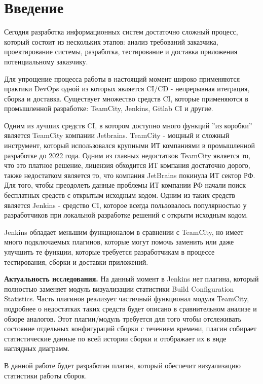 \chapter*{Введение} %

Сегодня разработка информационных систем достаточно сложный процесс, который состоит из нескольких этапов: анализ требований заказчика, проектирование системы, разработка, тестирование и доставка приложения потенциальному заказчику. 

Для упрощение процесса работы в настоящий момент широко применяются практики DevOps одной из которых является CI/CD - непрерывная итеграция, сборка и доставка. Существует множество средств CI, которые применяются в промышленной разработке: TeamCity, Jenkins, Gitlab CI и другие.

Одним из лучших средств CI, в котором доступно много функций ''из коробки'' является TeamCity компании Jetbrains. TeamCity - мощный и сложный инструмент, который использовался крупными ИТ компаниями в промышленной разработке до 2022 года. Одним из главных недостатков TeamCity является то, что это платное решение, лицензия обходится ИТ компания достаточно дорого, также недостатком является то, что компания JetBrains покинула ИТ сектор РФ. Для того, чтобы преодолеть данные проблемы ИТ компании РФ начали поиск бесплатных средств с открытым исходным кодом. Одним из таких средств является Jenkins - средство CI, которое всегда пользовалось популярностью у разработчиков при локальной разработке решений с открытм исходным кодом. 

Jenkins обладает меньшим функционалом в сравнении с TeamCity, но имеет много подключаемых плагинов, которые могут помочь заменить или даже улучшить те функции, которые требуется разработчикам в процессе тестирования, сборки и доставки приложений.

\textbf{Актуальность исследования.} На данный момент в Jenkins нет плагина, который полностью заменяет модуль визуализации статистики Build Configuration Statistics. Часть плагинов реализует частичный функционал модуля TeamCity, подробнее о недостатках таких средств будет описано в сравнительном анализе и обзоре аналогов. Этот плагин/модуль требуется для того чтобы отслеживать состояние отдельных конфигураций сборки с течением времени, плагин собирает статистические данные по всей истории сборки и отображает их в виде наглядных диаграмм. 

В данной работе будет разработан плагин, который обеспечит визуализацию статистики работы сборок.

